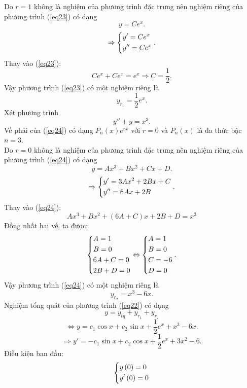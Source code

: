 \documentclass[12pt,a4paper]{article}
\begin{document}
Do \(r = 1\) không là nghiệm của phương trình đặc trưng nên nghiệm riêng của phương trình (\ref{eq23}) có dạng
\[y = C{e^x}.\]
\[ \Rightarrow \left\{ \begin{gathered}
  y' = C{e^x} \hfill \\
  y'' = C{e^x} \hfill \\ 
\end{gathered}  \right..\]
Thay vào (\ref{eq23}):
\[C{e^x} + C{e^x} = {e^x} \Rightarrow C = \frac{1}{2}.\]
Vậy phương trình (\ref{eq23}) có một nghiệm riêng là
\[{y_{{r_1}}} = \frac{1}{2}{e^x}.\]
Xét phương trình
\begin{equation}
y'' + y = {x^3}.
\label{eq24}
\end{equation}
Vế phải của (\ref{eq24}) có dạng \({P_n}\left( x \right){e^{rx}}\) với \(r = 0\) và \({P_n}\left( x \right)\) là đa thức bậc \(n = 3.\)\\
Do \(r = 0\) không là nghiệm của phương trình đặc trưng nên nghiệm riêng của phương trình (\ref{eq24}) có dạng
\[y = A{x^3} + B{x^2} + Cx + D.\]
\[ \Rightarrow \left\{ \begin{gathered}
  y' = 3A{x^2} + 2Bx + C \hfill \\
  y'' = 6Ax + 2B \hfill \\ 
\end{gathered}  \right..\]
Thay vào (\ref{eq24}):
\[A{x^3} + B{x^2} + \left( {6A + C} \right)x + 2B + D = {x^3}\]
Đồng nhất hai vế, ta được:
\[\left\{ \begin{gathered}
  A = 1 \hfill \\
  B = 0 \hfill \\
  6A + C = 0 \hfill \\
  2B + D = 0 \hfill \\ 
\end{gathered}  \right. \Leftrightarrow \left\{ \begin{gathered}
  A = 1 \hfill \\
  B = 0 \hfill \\
  C =  - 6 \hfill \\
  D = 0 \hfill \\ 
\end{gathered}  \right..\]
Vậy phương trình (\ref{eq24}) có một nghiệm riêng là
\[{y_{{r_2}}} = {x^3} - 6x.\]
Nghiệm tổng quát của phương trình (\ref{eq22}) có dạng
\[y = {y_{tq}} + {y_{{r_1}}} + {y_{{r_2}}}\]
\[ \Leftrightarrow y = {c_1}\cos x + {c_2}\sin x + \frac{1}{2}{e^x} + {x^3} - 6x.\]
\[ \Rightarrow y' =  - {c_1}\sin x + {c_2}\cos x + \frac{1}{2}{e^x} + 3{x^2} - 6.\]
Điều kiện ban đầu:
\[\left\{ \begin{gathered}
  y\left( 0 \right) = 0 \hfill \\
  y'\left( 0 \right) = 0 \hfill \\ 
\end{gathered}  \right.\]
\end{document}
